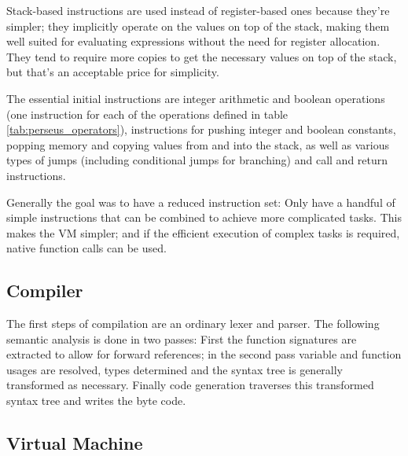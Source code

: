 			Stack-based instructions are used instead of register-based ones because they're simpler; they implicitly operate on the values on top of the stack, making them well suited for evaluating expressions without the need for register allocation. They tend to require more copies to get the necessary values on top of the stack, but that's an acceptable price for simplicity.
			
			The essential initial instructions are integer arithmetic and boolean operations (one instruction for each of the operations defined in table \ref{tab:perseus_operators}), instructions for pushing integer and boolean constants, popping memory and copying values from and into the stack, as well as various types of jumps (including conditional jumps for branching) and call and return instructions.
			
			Generally the goal was to have a reduced instruction set: Only have a handful of simple instructions that can be combined to achieve more complicated tasks. This makes the VM simpler; and if the efficient execution of complex tasks is required, native function calls can be used.
			
		
		\subsection{Compiler}
			
			The first steps of compilation are an ordinary lexer and parser. The following semantic analysis is done in two passes: First the function signatures are extracted to allow for forward references; in the second pass variable and function usages are resolved, types determined and the syntax tree is generally transformed as necessary. Finally code generation traverses this transformed syntax tree and writes the byte code.
			
		\subsection{Virtual Machine}
			
